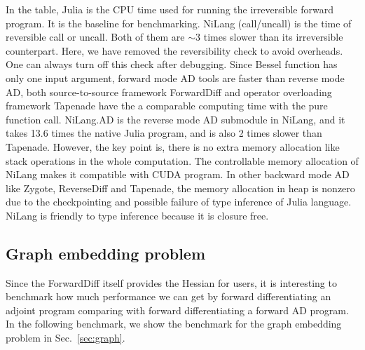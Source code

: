 \documentclass{article}
\newcommand{\<}{\langle}
\renewcommand{\>}{\rangle}
\newcommand{\Sec}[1]{Sec.~\ref{#1}}
\newcommand{\App}[1]{Appendix \ref{#1}}
\theoremstyle{definition}\newtheorem{definition}{\textit{Definition}}
\begin{document}
In the table, Julia is the CPU time used for running the irreversible forward program. It is the baseline for benchmarking.
NiLang (call/uncall) is the time of reversible call or uncall. Both of them are $\sim 3$ times slower than its irreversible counterpart. Here, we have removed the reversibility check to avoid overheads. One can always turn off this check after debugging.
Since Bessel function has only one input argument, forward mode AD tools are faster than reverse mode AD, both source-to-source framework ForwardDiff and operator overloading framework Tapenade have the a comparable computing time with the pure function call.
NiLang.AD is the reverse mode AD submodule in NiLang, and it takes 13.6 times the native Julia program, and is also 2 times slower than Tapenade. However, the key point is, there is no extra memory allocation like stack operations in the whole computation. The controllable memory allocation of NiLang makes it compatible with CUDA program.
In other backward mode AD like Zygote, ReverseDiff and Tapenade, the memory allocation in heap is nonzero due to the checkpointing and possible failure of type inference of Julia language. NiLang is friendly to type inference because it is closure free.

\subsection{Graph embedding problem}
Since the ForwardDiff itself provides the Hessian for users, it is interesting to benchmark how much performance we can get by forward differentiating an adjoint program comparing with forward differentiating a forward AD program. In the following benchmark, we show the benchmark for the graph embedding problem in \Sec{sec:graph}.
\end{document}
